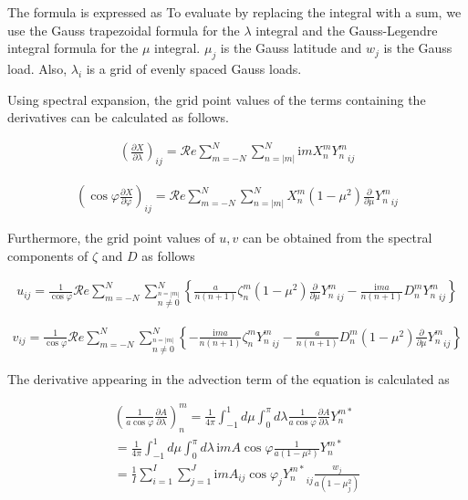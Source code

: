 The formula is expressed as To evaluate by replacing the integral with a
sum, we use the Gauss trapezoidal formula for the \(\lambda\) integral
and the Gauss-Legendre integral formula for the \(\mu\) integral.
\(\mu_j\) is the Gauss latitude and \(w_j\) is the Gauss load. Also,
\(\lambda_i\) is a grid of evenly spaced Gauss loads.

Using spectral expansion, the grid point values of the terms containing
the derivatives can be calculated as follows.

\begin{eqnarray}
        \left(  \frac{\partial X}{\partial \lambda} \right)_{ij}
     =  
        {\mathcal Re} \sum_{m=-N}^{N} \sum_{n=|m|}^{N} 
       \mathrm{i}m X_n^m {Y_n^m}_{ij}
\end{eqnarray}

\begin{eqnarray}
   \left( \cos\varphi \frac{\partial X}{\partial \varphi} \right)_{ij}
     =  {\mathcal Re} \sum_{m=-N}^{N} \sum_{n=|m|}^{N} 
       X_n^m 
       ( 1-\mu^{2} ) \frac{\partial }{\partial \mu} {Y_n^m}_{ij}
\end{eqnarray}

Furthermore, the grid point values of \(u,v\) can be obtained from the
spectral components of \(\zeta\) and \(D\) as follows

\begin{eqnarray}
  u_{ij}
  = \frac{1}{\cos\varphi}
     {\mathcal Re} \sum_{m=-N}^{N} 
                       \sum_{\stackrel{n=|m|}{n \neq 0}}^{N} 
    \left\{
             \frac{a}{n(n+1)} \zeta_n^m 
            (1-\mu^{2}) \frac{\partial{}}{\partial {\mu}} {Y_n^m}_{ij}
          -  \frac{\mathrm{i}m a}{n(n+1)} D_n^m {Y_n^m}_{ij}
    \right\}
\end{eqnarray}

\begin{eqnarray}
  v_{ij}
  = \frac{1}{\cos\varphi}
   {\mathcal Re} \sum_{m=-N}^{N}
                     \sum_{\stackrel{n=|m|}{n \neq 0}}^{N}
    \left\{
          -  \frac{\mathrm{i}m a}{n(n+1)} \zeta_n^m {Y_n^m}_{ij}
          -  \frac{a}{n(n+1)} D_n^m 
            (1-\mu^{2}) \frac{\partial{}}{\partial {\mu}} {Y_n^m}_{ij}
    \right\}
\end{eqnarray}

The derivative appearing in the advection term of the equation is
calculated as

\begin{eqnarray}
  \left( \frac{1}{a\cos\varphi} \frac{\partial{A}}{\partial {\lambda}} \right)_n^m 
   =  \frac{1}{4 \pi} 
        \int_{-1}^{1} d \mu \int_{0}^{\pi} d \lambda 
          \frac{1}{a\cos\varphi} \frac{\partial{A}}{\partial {\lambda}} Y_n^{m *} \\
   =  \frac{1}{4 \pi} 
        \int_{-1}^{1} d \mu \int_{0}^{\pi} d \lambda \,
          \mathrm{i}m A \cos\varphi \frac{1}{a(1-\mu^{2})} Y_n^{m *} \\
   =  \frac{1}{I} \sum_{i=1}^{I} \sum_{j=1}^{J}  
          \mathrm{i}m A_{ij} \cos\varphi_j
          {Y_n^{m *}}_{ij} \frac{w_j}{a(1-\mu_j^{2})} 
\end{eqnarray}

